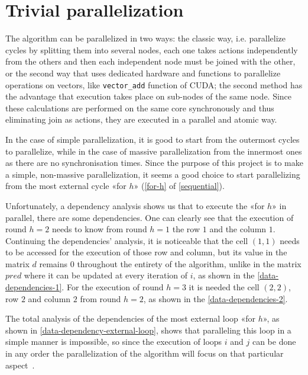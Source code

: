 \section{Trivial parallelization}\label{trivial_parallelization}

The algorithm can be parallelized in two ways: the classic way, i.e. parallelize cycles by splitting them into several nodes, each one takes actions independently from the others and then each independent node must be joined with the other, or the second way that uses dedicated hardware and functions to parallelize operations on vectors, like \texttt{vector\_add} function of CUDA; the second method has the advantage that execution takes place on sub-nodes of the same node. Since these calculations are performed on the same core
synchronously and thus eliminating join as actions, they are executed in a parallel and atomic way.

In the case of simple parallelization, it is good to start from the outermost cycles to parallelize, while in the case of massive parallelization from the innermost ones as there are no synchronisation times.
Since the purpose of this project is to make a simple, non-massive parallelization, it seems a good choice to start parallelizing from the most external cycle «for \(h\)» (\cref{for-h} of \cref{sequential}).

Unfortunately, a dependency analysis shows us that to execute the «for \(h\)»  in parallel, there are some dependencies. One can clearly see that the execution of round \(h=2\) needs to know from round \(h=1\) the row \(1\) and the column \(1\). Continuing the dependencies' analysis, it is noticeable that the cell \((1,1)\) needs to be accessed for the execution of those row and column, but its value in the matrix \(d\) remains \(0\) throughout the entirety of the algorithm, unlike in the matrix \(pred\) where it can be updated at every iteration of \( i\), as shown in the \cref{data-dependencies-1}.
For the execution of round \(h=3\) it is needed the cell \((2,2)\), row \(2\) and column \(2\) from round \(h=2\), as shown in the \cref{data-dependencies-2}.

The total analysis of the dependencies of the most external loop «for \(h\)», as shown in \cref{data-dependency-external-loop}, shows that paralleling this loop in a simple manner is impossible, so since the execution of loops \(i\) and \(j\) can be done in any order the parallelization of the algorithm will focus on that particular aspect~\cite{rucci}.

